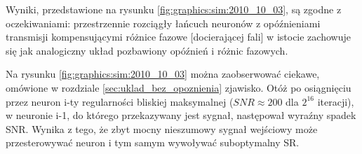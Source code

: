   Wyniki, przedstawione na rysunku \ref{fig:graphics:sim:2010_10_03}, są zgodne z oczekiwaniami: przestrzennie rozciągły łańcuch neuronów z opóźnieniami transmisji kompensującymi różnice fazowe [docierającej fali] w istocie zachowuje się jak analogiczny układ pozbawiony opóźnień i różnic fazowych.

  Na rysunku \ref{fig:graphics:sim:2010_10_03} można zaobserwować ciekawe, omówione w rozdziale \ref{sec:uklad_bez_opoznienia} zjawisko. Otóż po osiągnięciu przez neuron i-ty regularności bliskiej maksymalnej ($SNR \approx 200$ dla $2^{16}$ iteracji), w neuronie i-1, do którego przekazywany jest sygnał, następował wyraźny spadek SNR. Wynika z tego, że zbyt mocny nieszumowy sygnał wejściowy może przesterowywać neuron i tym samym wywoływać suboptymalny SR.



